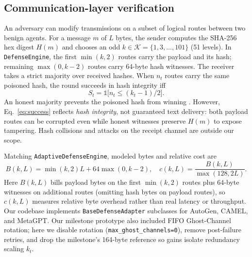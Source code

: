 \documentclass[10pt,twocolumn]{article}
\begin{document}
\subsection{Communication-layer verification}\label{sec:engine}
An adversary can modify transmissions on a subset of logical routes between two benign agents. For a message $m$ of $L$ bytes, the sender computes the SHA-256 hex digest $H(m)$ and chooses an odd $k\in\mathcal{K}=\{1,3,\ldots,101\}$ (51 levels). In \texttt{DefenseEngine}, the first $\min(k,2)$ routes carry the payload and its hash; remaining $\max(0,k-2)$ routes carry 64-byte hash witnesses. The receiver takes a strict majority over received hashes. When $n_t$ routes carry the same poisoned hash, the round succeeds in hash integrity iff
\begin{equation}\label{eq:success}
S_t=\mathbb{1}\big[n_t\leq(k_t-1)/2\big].
\end{equation}
An honest majority prevents the poisoned hash from winning \citep{lamport1982byzantine}. However, Eq.~\eqref{eq:success} reflects \emph{hash integrity}, not guaranteed text delivery: both payload routes can be corrupted even while honest witnesses preserve $H(m)$ to expose tampering. Hash collisions and attacks on the receipt channel are outside our scope.

Matching \texttt{AdaptiveDefenseEngine}, modeled bytes and relative cost are
\begin{equation}\label{eq:cost}
B(k,L)=\min(k,2)L+64\max(0,k-2),\quad
c(k,L)=\frac{B(k,L)}{\max(128,2L)}.
\end{equation}
Here $B(k,L)$ bills payload bytes on the first $\min(k,2)$ routes plus 64-byte witnesses on additional routes (omitting hash bytes on payload routes), so $c(k,L)$ measures relative byte overhead rather than real latency or throughput. Our codebase implements \texttt{BaseDefenseAdapter} subclasses for AutoGen, CAMEL, and MetaGPT. Our milestone prototype also included FIFO Ghost-Channel rotation; here we disable rotation (\texttt{max\_ghost\_channels=0}), remove post-failure retries, and drop the milestone's 164-byte reference so gains isolate redundancy scaling $k_t$.
\end{document}
